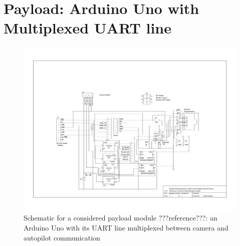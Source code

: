 \section{Payload: Arduino Uno with Multiplexed UART line}
\label{Payload_Schematic}
\begin{figure}[H]
\includegraphics[width=1.4\textwidth, angle=90]{schematics/payload_arduino_muxed.pdf}
\caption{Schematic for a considered payload module ???reference???: an 
Arduino Uno with its UART line multiplexed between camera and autopilot 
communication}
\end{figure}
